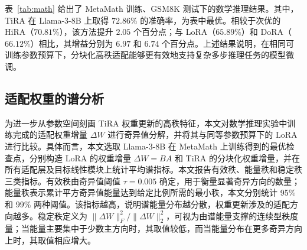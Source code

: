 ﻿\documentclass[UTF8,a4paper,11pt]{ctexart}
\newcommand{\DeltaW}{\Delta W}
\begin{document}
\begin{table}[H]
\centering
\caption{以 Llama-3-8B 为基座模型时，各参数高效微调方法在数学推理任务上的准确率对比。训练语料为 MetaMath，测试基准为 GSM8K。除 TiRA 外，其余基线结果引自 HiRA。最优结果以粗体标示，次优结果以下划线标示。}
\label{tab:math}
\setlength{\tabcolsep}{6pt}
\end{table}

表~\ref{tab:math} 给出了 MetaMath 训练、GSM8K 测试下的数学推理结果。其中，TiRA 在 Llama-3-8B 上取得 $72.86\%$ 的准确率，为表中最优。相较于次优的 HiRA（$70.81\%$），该方法提升 $2.05$ 个百分点；与 LoRA（$65.89\%$）和 DoRA（$66.12\%$）相比，其增益分别为 $6.97$ 和 $6.74$ 个百分点。上述结果说明，在相同可训练参数预算下，分块化高秩适配能够更有效地支持复杂多步推理任务的模型微调。

\subsection{适配权重的谱分析}

为进一步从参数空间刻画 TiRA 权重更新的高秩特征，本文对数学推理实验中训练完成的适配权重增量 $\DeltaW$ 进行奇异值分解，并将其与同等参数预算下的 LoRA 进行比较。具体而言，本文选取 Llama-3-8B 在 MetaMath 上训练得到的最优检查点，分别构造 LoRA 的权重增量 $\DeltaW=BA$ 和 TiRA 的分块化权重增量，并在所有适配层及目标线性模块上统计平均谱指标。本文报告有效秩、能量秩和稳定秩三类指标。有效秩由奇异值阈值 $\tau=0.005$ 确定，用于衡量显著奇异方向的数量；能量秩表示累计平方奇异值能量达到给定比例所需的最小秩，本文分别统计 95\% 和 99\% 两种阈值。该指标越高，说明谱能量分布越分散，权重更新涉及的适配方向越多。稳定秩定义为 $\|\DeltaW\|_F^2/\|\DeltaW\|_2^2$，可视为由谱能量支撑的连续型秩度量；当能量主要集中于少数主方向时，其取值较低，而当能量分布在更多奇异方向上时，其取值相应增大。
\end{document}

